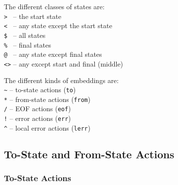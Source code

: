 \documentclass[letterpaper,11pt,oneside]{book}
\begin{document}
\vspace{10pt}

\begin{multicols}{2}
\raggedcolumns
\noindent The different classes of states are:\\
\hspace*{24pt}\verb|> | -- the start state\\
\hspace*{24pt}\verb|< | -- any state except the start state\\
\hspace*{24pt}\verb|$ | -- all states\\
\hspace*{24pt}\verb|% | -- final states\\
\hspace*{24pt}\verb|@ | -- any state except final states\\
\hspace*{24pt}\verb|<>| -- any except start and final (middle)
\vspace{12pt}

\columnbreak

\noindent The different kinds of embeddings are:\\
\hspace*{24pt}\verb|~| -- to-state actions (\verb|to|)\\
\hspace*{24pt}\verb|*| -- from-state actions (\verb|from|)\\
\hspace*{24pt}\verb|/| -- EOF actions (\verb|eof|)\\
\hspace*{24pt}\verb|!| -- error actions (\verb|err|)\\
\hspace*{24pt}\verb|^| -- local error actions (\verb|lerr|)
\vspace{12pt}

\end{multicols}

\subsection{To-State and From-State Actions}

\subsubsection{To-State Actions}
\end{document}
